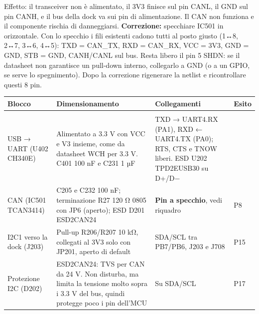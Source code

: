 \begin{critbox}
 Effetto: il transceiver non è alimentato, il 3V3 finisce sul pin CANL, il GND sul pin CANH, e il bus della dock va sui pin di alimentazione. Il CAN non funziona e il componente rischia di danneggiarsi.\newline{} \textbf{Correzione:} specchiare IC501 in orizzontale. Con lo specchio i fili esistenti cadono tutti al posto giusto (1↔8, 2↔7, 3↔6, 4↔5): TXD = CAN\_\allowbreak{}TX, RXD = CAN\_\allowbreak{}RX, VCC = 3V3, GND = GND, STB = GND, CANH/\allowbreak{}CANL sul bus. Resta libero il pin 5 SHDN: se il datasheet non garantisce un pull-down interno, collegarlo a GND (o a un GPIO, se serve lo spegnimento). Dopo la correzione rigenerare la netlist e ricontrollare questi 8 pin.
\end{critbox}

{\footnotesize{}\setlength{\tabcolsep}{4pt}\renewcommand{\arraystretch}{1.1}
\begin{xltabular}{\linewidth}{>{\hsize\raggedright\arraybackslash}X>{\hsize\raggedright\arraybackslash}X>{\hsize\raggedright\arraybackslash}X>{\hsize\raggedright\arraybackslash}X}
\toprule
\textbf{Blocco} & \textbf{Dimensionamento} & \textbf{Collegamenti} & \textbf{Esito} \\
\midrule
\endhead
\midrule[0.15pt]\\\bottomrule\endfoot
\bottomrule\endlastfoot
USB → UART (U402 CH340E) & Alimentato a 3.3 V con VCC e V3 insieme, come da datasheet WCH per 3.3 V. C401 100 nF e C231 1 µF & TXD → UART4.RX (PA1), RXD ← UART4.TX (PA0); RTS, CTS e TNOW liberi. ESD U202 TPD2EUSB30 su D+/\allowbreak{}D− &  \\\midrule[0.15pt]
CAN (IC501 TCAN3414) & C205 e C232 100 nF; terminazione R27 120 Ω 0805 con JP6 (aperto); ESD D201 ESD2CAN24 & \textbf{Pin a specchio}, vedi riquadro &  P8 \\\midrule[0.15pt]
I2C1 verso la dock (J203) & Pull-up R206/\allowbreak{}R207 10 kΩ, collegati al 3V3 solo con JP201, aperto di default & SDA/\allowbreak{}SCL tra PB7/\allowbreak{}PB6, J203 e J708 &  P15 \\\midrule[0.15pt]
Protezione I2C (D202) & ESD2CAN24: TVS per CAN da 24 V. Non disturba, ma limita la tensione molto sopra i 3.3 V del bus, quindi protegge poco i pin dell'MCU & Su SDA/\allowbreak{}SCL &  P17 \\\midrule[0.15pt]

\end{xltabular}}
